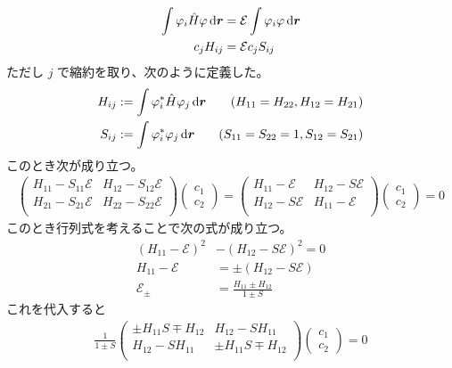 \documentclass[uplatex,dvipdfmx,a4paper,11pt]{jlreq}
\newcommand{\E}{\mathcal{E}}
\begin{document}
\begin{align}
  \int\varphi_i\hat{H}\varphi\dl{\rr} & = \E\int\varphi_i\varphi\dl{\rr} \\
  c_jH_{ij}                           & = \E c_jS_{ij}
\end{align}
ただし $j$ で縮約を取り、次のように定義した。
\begin{align}
  H_{ij} & := \int\varphi_i^*\hat{H}\varphi_j\dl{\rr} & (H_{11} = H_{22}, H_{12} = H_{21})     \\
  S_{ij} & := \int\varphi_i^*\varphi_j\dl{\rr}        & (S_{11} = S_{22} = 1, S_{12} = S_{21})
\end{align}
このとき次が成り立つ。
\begin{align}
  \begin{pmatrix}
    H_{11} - S_{11}\mathcal{E} & H_{12} - S_{12}\mathcal{E} \\
    H_{21} - S_{21}\mathcal{E} & H_{22} - S_{22}\mathcal{E} \\
  \end{pmatrix}
  \begin{pmatrix}
    c_1 \\ c_2
  \end{pmatrix}
  =
  \begin{pmatrix}
    H_{11} - \mathcal{E}  & H_{12} - S\mathcal{E} \\
    H_{12} - S\mathcal{E} & H_{11} - \mathcal{E}  \\
  \end{pmatrix}
  \begin{pmatrix}
    c_1 \\ c_2
  \end{pmatrix}
  = 0
\end{align}
このとき行列式を考えることで次の式が成り立つ。
\begin{align}
  (H_{11} - \mathcal{E})^2 & - (H_{12} - S\mathcal{E})^2 = 0     \\
  H_{11} - \mathcal{E}     & = \pm (H_{12} - S\mathcal{E})       \\
  \mathcal{E}_\pm          & = \frac{H_{11} \pm H_{12}}{1 \pm S}
\end{align}
これを代入すると
\begin{align}
  \frac{1}{1 \pm S}
  \begin{pmatrix}
    \pm H_{11}S \mp H_{12} & H_{12} - SH_{11}       \\
    H_{12} - SH_{11}       & \pm H_{11}S \mp H_{12} \\
  \end{pmatrix}
  \begin{pmatrix}
    c_1 \\ c_2
  \end{pmatrix}
  = 0
\end{align}
\end{document}
